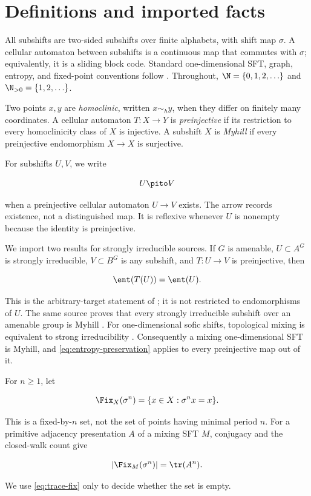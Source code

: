 \section{Definitions and imported facts}
\label{sec:preliminaries}

All subshifts are two-sided subshifts over finite alphabets, with shift map
$\sigma$.  A cellular automaton between subshifts is a continuous map that
commutes with $\sigma$; equivalently, it is a sliding block code.  Standard
one-dimensional SFT, graph, entropy, and fixed-point conventions follow
\cite{lindMarcus2021}.
Throughout, $\N=\{0,1,2,\ldots\}$ and $\N_{>0}=\{1,2,\ldots\}$.

Two points $x,y$ are \emph{homoclinic}, written $x\sim_h y$, when they differ
on finitely many coordinates.  A cellular automaton $T:X\to Y$ is
\emph{preinjective} if its restriction to every homoclinicity class of $X$ is
injective.  A subshift $X$ is \emph{Myhill} if every preinjective endomorphism
$X\to X$ is surjective.

For subshifts $U,V$, we write

\begin{equation}
  U\pito V
  \label{eq:pi-arrow}
\end{equation}

when a preinjective cellular automaton $U\to V$ exists.  The arrow records
existence, not a distinguished map.  It is reflexive whenever $U$ is nonempty
because the identity is preinjective.

We import two results for strongly irreducible sources.  If $G$ is amenable,
$U\subset A^G$ is strongly irreducible, $V\subset B^G$ is any subshift, and
$T:U\to V$ is preinjective, then

\begin{equation}
  \ent(T(U))=\ent(U).
  \label{eq:entropy-preservation}
\end{equation}

This is the arbitrary-target statement of
\cite[Theorem~5.1]{ceccheriniCoornaert2012}; it is not restricted to
endomorphisms of $U$.  The same source proves that every strongly irreducible
subshift over an amenable group is Myhill
\cite[Theorem~1.1]{ceccheriniCoornaert2012}.  For one-dimensional sofic
shifts, topological mixing is equivalent to strong irreducibility
\cite[Corollary~1.3]{ceccheriniCoornaert2012}.  Consequently a mixing
one-dimensional SFT is Myhill, and \eqref{eq:entropy-preservation} applies to
every preinjective map out of it.

For $n\geq1$, let

\[
  \Fix_X(\sigma^n)=\{x\in X:\sigma^n x=x\}.
\]

This is a fixed-by-$n$ set, not the set of points having minimal period $n$.
For a primitive adjacency presentation $A$ of a mixing SFT $M$, conjugacy and
the closed-walk count give

\begin{equation}
  |\Fix_M(\sigma^n)|=\tr(A^n).
  \label{eq:trace-fix}
\end{equation}

We use \eqref{eq:trace-fix} only to decide whether the set is empty.

